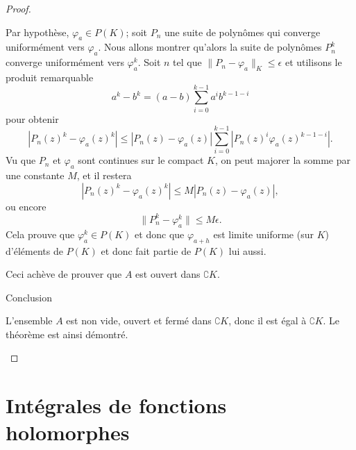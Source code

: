 \begin{proof}
\begin{subproof}
		Par hypothèse, \( \varphi_a\in P(K)\); soit \( P_n\) une suite de polynômes qui converge uniformément vers \( \varphi_a\). Nous allons montrer qu'alors la suite de polynômes \( P_n^k\) converge uniformément vers \( \varphi_a^k\). Soit \( n\) tel que \( \| P_n-\varphi_a \|_{K}\leq \epsilon\) et utilisons le produit remarquable
		\begin{equation}
			a^k-b^k=(a-b)\sum_{i=0}^{k-1}a^ib^{k-1-i}
		\end{equation}
		pour obtenir
		\begin{equation}
			| P_n(z)^k-\varphi_a(z)^k |\leq | P_n(z)-\varphi_a(z) |\sum_{i=0}^{k-1}| P_n(z)^i\varphi_a(z)^{k-1-i} |.
		\end{equation}
		Vu que \( P_n\) et \( \varphi_a\) sont continues sur le compact \( K\), on peut majorer la somme par une constante \( M\), et il restera
		\begin{equation}
			| P_n(z)^k-\varphi_a(z)^k |\leq M | P_n(z)-\varphi_a(z) |,
		\end{equation}
		ou encore
		\begin{equation}
			\| P_n^k-\varphi_a^k \|\leq M\epsilon.
		\end{equation}
		Cela prouve que \( \varphi_a^{k}\in P(K)\) et donc que \( \varphi_{a+h}\) est limite uniforme (sur \( K\)) d'éléments de \( P(K)\) et donc fait partie de \( P(K)\) lui aussi.

		Ceci achève de prouver que \( A\) est ouvert dans \( \complement K\).
		\item[Conclusion]

		L'ensemble \( A\) est non vide, ouvert et fermé dans \( \complement K\), donc il est égal à \( \complement K\). Le théorème est ainsi démontré.
	\end{subproof}
\end{proof}

\section{Intégrales de fonctions holomorphes}

